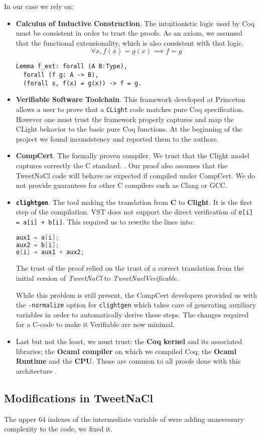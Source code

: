 In our case we rely on:
\begin{itemize}
  \item \textbf{Calculus of Inductive Construction}. The intuitionistic logic
  used by Coq must be consistent in order to trust the proofs. As an axiom,
  we assumed that the functional extensionality, which is also consistent with that logic.
  $$\forall x, f(x) = g(x) \implies f = g$$
\begin{lstlisting}[language=Coq]
Lemma f_ext: forall (A B:Type),
  forall (f g: A -> B),
  (forall x, f(x) = g(x)) -> f = g.
\end{lstlisting}

  \item \textbf{Verifiable Software Toolchain}. This framework developed at
  Princeton allows a user to prove that a \texttt{CLight} code matches pure Coq
  specification. However one must trust the framework properly captures and
  map the CLight behavior to the basic pure Coq functions. At the beginning of
  the project we found inconsistency and reported them to the authors.

  \item \textbf{CompCert}. The formally proven compiler. We trust that the Clight
  model captures correctly the C standard.
  .
  Our proof also assumes that the TweetNaCl code will behave as expected if
  compiled under CompCert. We do not provide guarantees for other C compilers
  such as Clang or GCC.

  \item \textbf{\texttt{clightgen}}. The tool making the translation from \textbf{C} to
  \textbf{Clight}. It is the first step of the compilation.
  VST does not support the direct verification of \texttt{o[i] = a[i] + b[i]}.
  This required us to rewrite the lines into:
\begin{lstlisting}[language=C]
aux1 = a[i];
aux2 = b[i];
o[i] = aux1 + aux2;
\end{lstlisting}
  The trust of the proof relied on the trust of a correct translation from the
  initial version of \textit{TweetNaCl} to \textit{TweetNaclVerificable}.

  While this problem is still present, the CompCert developers provided us with
  the \texttt{-normalize} option for \texttt{clightgen} which takes care of
  generating auxiliary variables in order to automatically derive these steps.
  The changes required for a C-code to make it Verifiable are now minimal.

  \item Last but not the least, we must trust: the \textbf{Coq kernel} and its
  associated libraries; the \textbf{Ocaml compiler} on which we compiled Coq;
  the \textbf{Ocaml Runtime} and the \textbf{CPU}. Those are common to all proofs
  done with this architecture \cite{2015-Appel,coq-faq}.
\end{itemize}

\subsection{Modifications in TweetNaCl}

The upper 64 indexes of the  intermediate variable of
 were adding unnecessary complexity to the code,
we fixed it.

